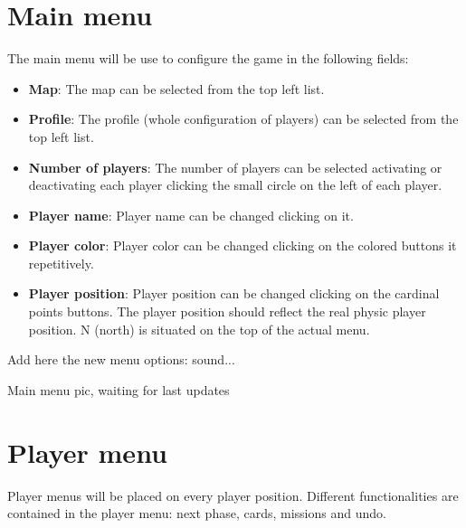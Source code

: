 \documentclass[12pt,a4paper]{article}
\begin{document}
\section{Main menu}
The main menu will be use to configure the game in the following fields:

\begin{itemize}
\item {\bf Map}: The map can be selected from the top left list.
\item {\bf Profile}: The profile (whole configuration of players) can be selected from the top left list.
\item {\bf Number of players}: The number of players can be selected activating or deactivating each player clicking the small circle on the left of each player.
\item {\bf Player name}: Player name can be changed clicking on it.
\item {\bf Player color}: Player color can be changed clicking on the colored buttons it repetitively.
\item {\bf Player position}: Player position can be changed clicking on the cardinal points buttons. The player position should reflect the real physic player position. N (north) is situated on the top of the actual menu.
\end{itemize}

\begin{todo}[Alberto]
  Add here the new menu options: sound...
\end{todo}

\begin{todo}[Alberto]
  Main menu pic, waiting for last updates
\end{todo}

\section{Player menu}
Player menus will be placed on every player position. Different functionalities are contained in the player menu: next phase, cards, missions and undo.
\end{document}
